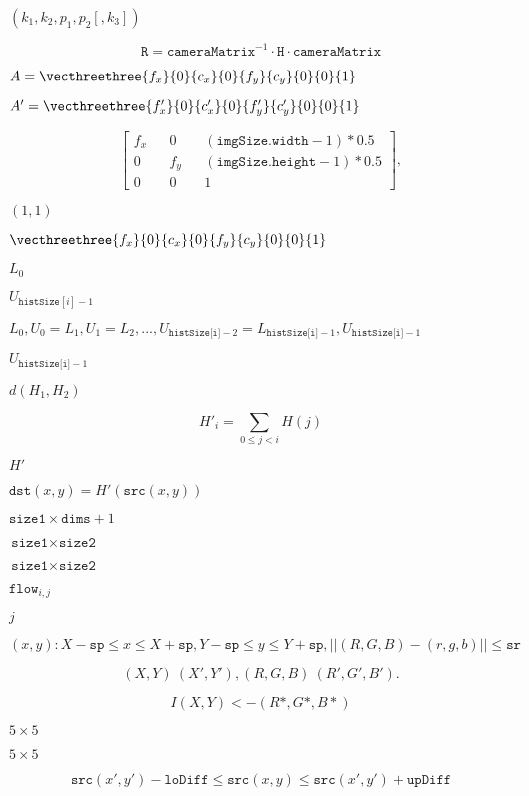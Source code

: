 \documentclass{article}
\begin{document}
$(k_1, k_2, p_1, p_2[, k_3])$
\pagebreak

\[\texttt{R} = \texttt{cameraMatrix} ^{-1} \cdot \texttt{H} \cdot \texttt{cameraMatrix}\]
\pagebreak

$A=\vecthreethree{f_x}{0}{c_x}{0}{f_y}{c_y}{0}{0}{1}$
\pagebreak

$A'=\vecthreethree{f_x'}{0}{c_x'}{0}{f_y'}{c_y'}{0}{0}{1}$
\pagebreak

\[\begin{bmatrix} f_x && 0 && ( \texttt{imgSize.width} -1)*0.5  \\ 0 && f_y && ( \texttt{imgSize.height} -1)*0.5  \\ 0 && 0 && 1 \end{bmatrix} ,\]
\pagebreak

$(1,1)$
\pagebreak

$\vecthreethree{f_x}{0}{c_x}{0}{f_y}{c_y}{0}{0}{1}$
\pagebreak

$L_0$
\pagebreak

$U_{\texttt{histSize}[i]-1}$
\pagebreak

$L_0, U_0=L_1, U_1=L_2, ..., U_{\texttt{histSize[i]}-2}=L_{\texttt{histSize[i]}-1}, U_{\texttt{histSize[i]}-1}$
\pagebreak

$U_{\texttt{histSize[i]}-1}$
\pagebreak

$d(H_1, H_2)$
\pagebreak

\[H'_i =  \sum _{0  \le j < i} H(j)\]
\pagebreak

$H'$
\pagebreak

$\texttt{dst}(x,y) = H'(\texttt{src}(x,y))$
\pagebreak

$\texttt{size1}\times \texttt{dims}+1$
\pagebreak

$\texttt{size1}\times \texttt{size2}$
\pagebreak

$\texttt{size1} \times \texttt{size2}$
\pagebreak

$\texttt{flow}_{i,j}$
\pagebreak

$j$
\pagebreak

\[(x,y): X- \texttt{sp} \le x  \le X+ \texttt{sp} , Y- \texttt{sp} \le y  \le Y+ \texttt{sp} , ||(R,G,B)-(r,g,b)||   \le \texttt{sr}\]
\pagebreak

\[(X,Y)~(X',Y'), (R,G,B)~(R',G',B').\]
\pagebreak

\[I(X,Y) <- (R*,G*,B*)\]
\pagebreak

$5\times 5$
\pagebreak

$5\times
5$
\pagebreak

\[\texttt{src} (x',y')- \texttt{loDiff} \leq \texttt{src} (x,y)  \leq \texttt{src} (x',y')+ \texttt{upDiff}\]
\pagebreak
\end{document}
